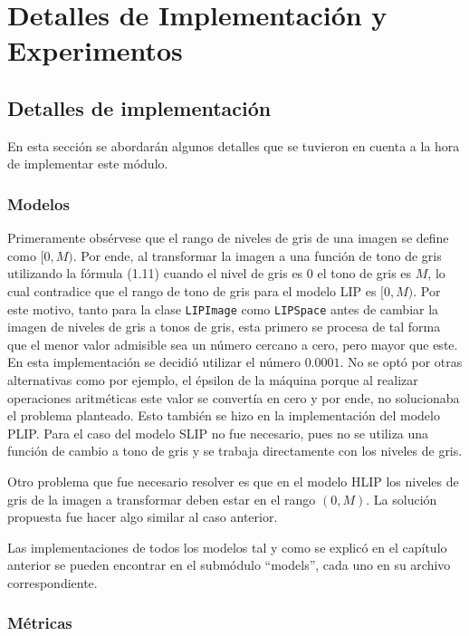 \chapter{Detalles de Implementación y Experimentos}\label{chapter:implementation}

\section{Detalles de implementaci\'on}

En esta secci\'on se abordar\'an algunos detalles que se tuvieron en cuenta a la hora de implementar este m\'odulo.

\subsection{Modelos}

Primeramente obs\'ervese que el rango de niveles de gris de una imagen se define como $[0,M)$. Por ende, al transformar la imagen a una funci\'on de tono de gris utilizando la f\'ormula (1.11) cuando el nivel de gris es 0 el tono de gris es $M$, lo cual contradice que el rango de tono de gris para el modelo LIP es $[0,M)$. Por este motivo, tanto para la clase \verb|LIPImage| como \verb|LIPSpace| antes de cambiar la imagen de niveles de gris a tonos de gris, esta primero se procesa de tal forma que el menor valor admisible sea un n\'umero cercano a cero, pero mayor que este. En esta implementaci\'on se decidi\'o utilizar el n\'umero $0.0001$. No se opt\'o por otras alternativas como por ejemplo, el \'epsilon de la m\'aquina porque al realizar operaciones aritm\'eticas este valor se convert\'ia en cero y por ende, no solucionaba el problema planteado. Esto tambi\'en se hizo en la implementaci\'on del modelo PLIP. Para el caso del modelo SLIP no fue necesario, pues no se utiliza una funci\'on de cambio a tono de gris y se trabaja directamente con los niveles de gris.

Otro problema que fue necesario resolver es que en el modelo HLIP los niveles de gris de la imagen a transformar deben estar en el rango $(0,M)$. La soluci\'on propuesta fue hacer algo similar al caso anterior.

Las implementaciones de todos los modelos tal y como se explic\'o en el cap\'itulo anterior se pueden encontrar en el subm\'odulo ``models'', cada uno en su archivo correspondiente.

\subsection{M\'etricas}

